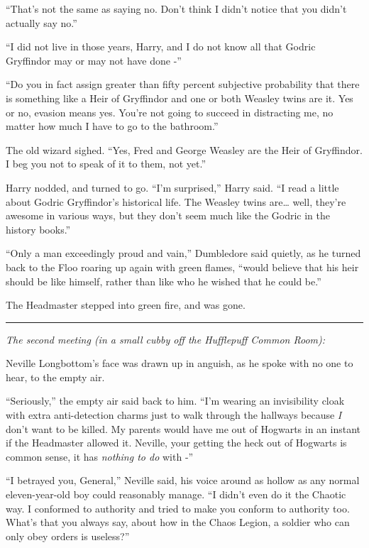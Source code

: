 ``That's not the same as saying no. Don't think I didn't notice that you
didn't actually say no.''

``I did not live in those years, Harry, and I do not know all that
Godric Gryffindor may or may not have done -''

``Do you in fact assign greater than fifty percent subjective
probability that there is something like a Heir of Gryffindor and one or
both Weasley twins are it. Yes or no, evasion means yes. You're not
going to succeed in distracting me, no matter how much I have to go to
the bathroom.''

The old wizard sighed. ``Yes, Fred and George Weasley are the Heir of
Gryffindor. I beg you not to speak of it to them, not yet.''

Harry nodded, and turned to go. ``I'm surprised,'' Harry said. ``I read
a little about Godric Gryffindor's historical life. The Weasley twins
are\ldots{} well, they're awesome in various ways, but they don't seem
much like the Godric in the history books.''

``Only a man exceedingly proud and vain,'' Dumbledore said quietly, as
he turned back to the Floo roaring up again with green flames, ``would
believe that his heir should be like himself, rather than like who he
wished that he could be.''

The Headmaster stepped into green fire, and was gone.

\begin{center}\rule{3in}{0.4pt}\end{center}

\emph{The second meeting (in a small cubby off the Hufflepuff Common
Room):}

Neville Longbottom's face was drawn up in anguish, as he spoke with no
one to hear, to the empty air.

``Seriously,'' the empty air said back to him. ``I'm wearing an
invisibility cloak with extra anti-detection charms just to walk through
the hallways because \emph{I} don't want to be killed. My parents would
have me out of Hogwarts in an instant if the Headmaster allowed it.
Neville, your getting the heck out of Hogwarts is common sense, it has
\emph{nothing to do} with -''

``I betrayed you, General,'' Neville said, his voice around as hollow as
any normal eleven-year-old boy could reasonably manage. ``I didn't even
do it the Chaotic way. I conformed to authority and tried to make you
conform to authority too. What's that you always say, about how in the
Chaos Legion, a soldier who can only obey orders is useless?''

